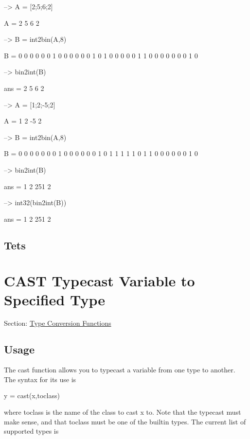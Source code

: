 \begin{DoxyVerbInclude}
--> A = [2;5;6;2]

A = 
 2 
 5 
 6 
 2 

--> B = int2bin(A,8)

B = 
 0 0 0 0 0 0 1 0 
 0 0 0 0 0 1 0 1 
 0 0 0 0 0 1 1 0 
 0 0 0 0 0 0 1 0 

--> bin2int(B)

ans = 
 2 
 5 
 6 
 2 

--> A = [1;2;-5;2]

A = 
  1 
  2 
 -5 
  2 

--> B = int2bin(A,8)

B = 
 0 0 0 0 0 0 0 1 
 0 0 0 0 0 0 1 0 
 1 1 1 1 1 0 1 1 
 0 0 0 0 0 0 1 0 

--> bin2int(B)

ans = 
   1 
   2 
 251 
   2 

--> int32(bin2int(B))

ans = 
   1 
   2 
 251 
   2 
\end{DoxyVerbInclude}
\hypertarget{/home/sbasu/Devel/FreeMat/doc/typecast/bin2int.doc_Tets}{}\subsection{Tets}\label{/home/sbasu/Devel/FreeMat/doc/typecast/bin2int.doc_Tets}
\hypertarget{typecast_cast}{}\section{C\-A\-S\-T Typecast Variable to Specified Type}\label{typecast_cast}
Section\-: \hyperlink{sec_typecast}{Type Conversion Functions} \hypertarget{vtkwidgets_vtkxyplotwidget_Usage}{}\subsection{Usage}\label{vtkwidgets_vtkxyplotwidget_Usage}
The {\ttfamily cast} function allows you to typecast a variable from one type to another. The syntax for its use is \begin{DoxyVerb}    y = cast(x,toclass)
\end{DoxyVerb}
 where {\ttfamily toclass} is the name of the class to cast {\ttfamily x} to. Note that the typecast must make sense, and that {\ttfamily toclass} must be one of the builtin types. The current list of supported types is 
